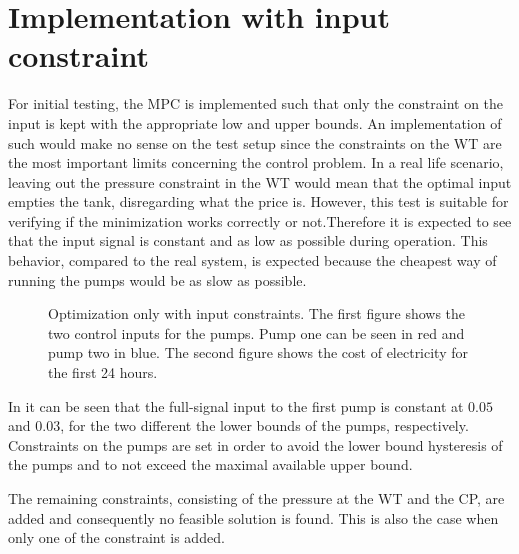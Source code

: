 \section{Implementation with input constraint}
\label{input constraint}

For initial testing, the MPC is implemented such that only the constraint on the input is kept with the appropriate low and upper bounds. An implementation of such would make no sense on the test setup since the constraints on the WT are the most important limits concerning the control problem. In a real life scenario, leaving out the pressure constraint in the WT would mean that the optimal input empties the tank, disregarding what the price is. However, this test is suitable for verifying if the minimization works correctly or not.Therefore it is expected to see that the input signal is constant and as low as possible during operation. This behavior, compared to the real system, is expected because the cheapest way of running the pumps would be as slow as possible. 

\begin{figure}[H]
\centering
 
\caption{Optimization only with input constraints. The first figure shows the two control inputs for the pumps. Pump one can be seen in red and pump two in blue. The second figure shows the cost of electricity for the first 24 hours.}
\label{fig:Implementation_shit}
\end{figure}

In  it can be seen that the full-signal input to the first pump is constant at $0.05$ and $0.03$, for the two different the lower bounds of the pumps, respectively. Constraints on the pumps are set in order to avoid the lower bound hysteresis of the pumps and to not exceed the maximal available upper bound. 


The remaining constraints, consisting of the pressure at the WT and the CP, are added and consequently no feasible solution is found. This is also the case when only one of the constraint is added. 


